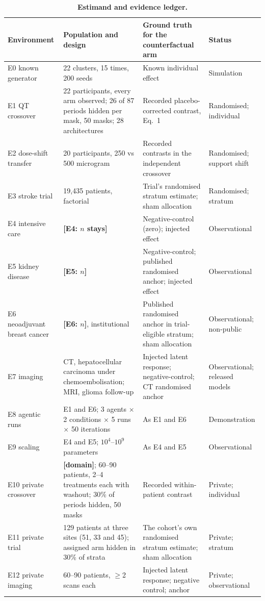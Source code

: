 \documentclass[11pt,a4paper]{article}
\newcommand{\tbd}[1]{{\color{red}\textbf{[#1]}}}
\begin{document}
\begin{table}[!htbp]\centering\footnotesize
\caption{\textbf{Estimand and evidence ledger.}}\label{tab:estimands}
\begin{tabularx}{\textwidth}{@{}>{\raggedright\arraybackslash}p{2.4cm} Y Y Y@{}}\toprule
Environment & Population and design & Ground truth for the counterfactual arm & Status\\\midrule
E0 known generator & 22 clusters, 15 times, 200 seeds & Known individual effect & Simulation\\
E1 QT crossover & 22 participants, every arm observed; 26 of 87 periods hidden per mask, 50 masks; 28 architectures & Recorded placebo-corrected contrast, Eq.~1 & Randomised; individual\\
E2 dose-shift transfer & 20 participants, 250 vs 500 microgram & Recorded contrasts in the independent crossover & Randomised; support shift\\
E3 stroke trial & 19,435 patients, factorial & Trial's randomised stratum estimate; sham allocation & Randomised; stratum\\
E4 intensive care & \tbd{E4: $n$ stays} & Negative-control (zero); injected effect & Observational\\
E5 kidney disease & \tbd{E5: $n$} & Negative-control; published randomised anchor; injected effect & Observational\\
E6 neoadjuvant breast cancer & \tbd{E6: $n$}, institutional & Published randomised anchor in trial-eligible stratum; sham allocation & Observational; non-public\\
E7 imaging & CT, hepatocellular carcinoma under chemoembolisation; MRI, glioma follow-up & Injected latent response; negative-control; CT randomised anchor & Observational; released models\\
E8 agentic runs & E1 and E6; 3 agents $\times$ 2 conditions $\times$ 5 runs $\times$ 50 iterations & As E1 and E6 & Demonstration\\
E9 scaling & E4 and E5; $10^4$--$10^9$ parameters & As E4 and E5 & Observational\\
E10 private crossover & \tbd{domain}; 60--90 patients, 2--4 treatments each with washout; 30\% of periods hidden, 50 masks & Recorded within-patient contrast & Private; individual\\
E11 private trial & 129 patients at three sites (51, 33 and 45); assigned arm hidden in 30\% of strata & The cohort's own randomised stratum estimate; sham allocation & Private; stratum\\
E12 private imaging & 60--90 patients, $\ge$2 scans each & Injected latent response; negative control; anchor & Private; observational\\
\bottomrule\end{tabularx}
\end{table}
\end{document}
